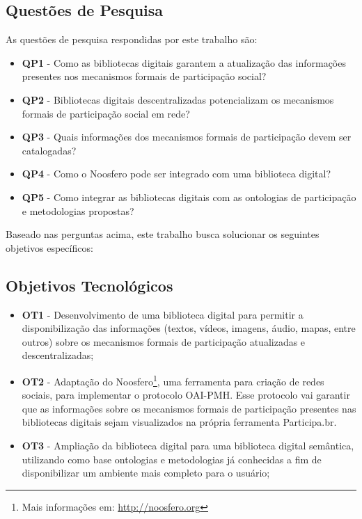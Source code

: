 \subsection{Questões de Pesquisa}

As questões de pesquisa respondidas por este trabalho são:

\begin{itemize}
\item \textbf{QP1} - Como as bibliotecas digitais garantem a atualização das informações presentes nos mecanismos formais de participação social?
\item \textbf{QP2} - Bibliotecas digitais descentralizadas potencializam os mecanismos formais de participação social em rede?
\item \textbf{QP3} - Quais informações dos mecanismos formais de participação devem ser catalogadas?
\item \textbf{QP4} - Como o Noosfero pode ser integrado com uma biblioteca digital?
\item \textbf{QP5} - Como integrar as bibliotecas digitais com as ontologias de participação e metodologias propostas?
\end{itemize} 

Baseado nas perguntas acima, este trabalho busca solucionar os seguintes objetivos específicos: 

\subsection*{Objetivos Tecnológicos}

\begin{itemize}
\item \textbf{OT1} - Desenvolvimento de uma biblioteca digital para permitir a disponibilização das informações (textos, vídeos, imagens, áudio, mapas, entre outros) sobre os mecanismos formais de participação atualizadas e descentralizadas;
\item \textbf{OT2} - Adaptação do Noosfero\footnote{Mais informações em: \url{http://noosfero.org}}, uma ferramenta para criação de redes sociais, para implementar o protocolo OAI-PMH.
%
Esse protocolo vai garantir que as informações sobre os mecanismos formais de participação presentes nas bibliotecas digitais sejam visualizados na própria ferramenta Participa.br.
\item \textbf{OT3} - Ampliação da biblioteca digital para uma biblioteca digital semântica, utilizando como base ontologias e metodologias já conhecidas a fim de disponibilizar um ambiente mais completo para o usuário;
\end{itemize}


